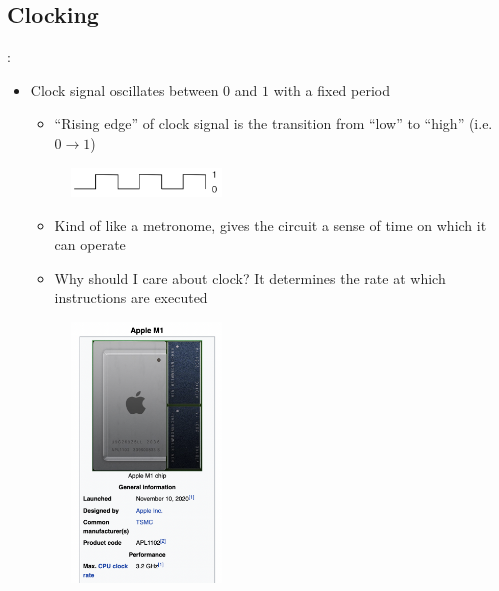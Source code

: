 \documentclass{../slides}
\begin{document}
\subsection{Clocking}
\begin{frame}{\secname: \subsecname}
    \begin{multicols}{2}
        \begin{itemize}
            \item Clock signal oscillates between $0$ and $1$ with a fixed period
            \begin{itemize}
                \item \enquote{Rising edge} of clock signal is the transition from \enquote{low} to \enquote{high} (i.e. $0\to 1$)
            \end{itemize}
            \begin{figure}[H]
                \centering
                \includegraphics[width = 4cm]{img/clock.png}
            \end{figure}
            \begin{itemize}
                \item Kind of like a metronome, gives the circuit a sense of time on which it can operate
            \end{itemize}
            \begin{itemize}
                \item Why should I care about clock? It determines the rate at which instructions are executed
            \end{itemize}
            \begin{figure}[H]
                \centering
                \includegraphics[width = 4cm]{img/m1.png}
            \end{figure}
        \end{itemize}
    \end{multicols}
\end{frame}
\end{document}
